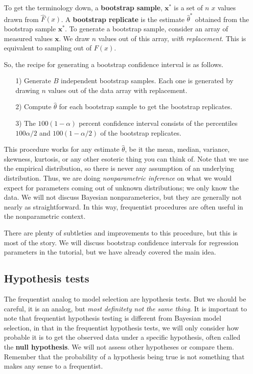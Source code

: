 To get the terminology down, a \textbf{bootstrap sample}, $\mathbf{x}^*$ is a set of $n$ $x$ values drawn from $\hat{F}(x)$. A \textbf{bootstrap replicate} is the estimate $\hat{\theta}^*$ obtained from the bootstrap sample $\mathbf{x}^*$. To generate a bootstrap sample, consider an array of measured values $\mathbf{x}$. We draw $n$ values out of this array, \textit{with replacement}. This is equivalent to sampling out of $F(x)$.

So, the recipe for generating a bootstrap confidence interval is as follows.
\begin{enumerate}
    \item[1)] Generate $B$ independent bootstrap samples. Each one is generated by drawing $n$ values out of the data array with replacement.
    \item[2)] Compute $\hat{\theta}$ for each bootstrap sample to get the bootstrap replicates.
    \item[3)] The $100 (1-\alpha)$ percent confidence interval consists of the percentiles $100\alpha/2$ and $100(1-\alpha/2)$ of the bootstrap replicates.
\end{enumerate}

This procedure works for any estimate $\hat{\theta}$, be it the mean, median, variance, skewness, kurtosis, or any other esoteric thing you can think of. Note that we use the empirical distribution, so there is never any assumption of an underlying distribution. Thus, we are doing \textit{nonparametric inference} on what we would expect for parameters coming out of unknown distributions; we only know the data. We will not discuss Bayesian nonparameterics, but they are generally not nearly as straightforward. In this way, frequentist procedures are often useful in the nonparametric context.

There are plenty of subtleties and improvements to this procedure, but this is most of the story. We will discuss bootstrap confidence intervals for regression parameters in the tutorial, but we have already covered the main idea.


\subsection{Hypothesis tests}
The frequentist analog to model selection are hypothesis tests. But we should be careful, it is an analog, but \textit{most definitety not the same thing}. It is important to note that frequentist hypothesis testing is different from Bayesian model selection, in that in the frequentist hypothesis tests, we will only consider how probable it is to get the observed data under a specific hypothesis, often called the \textbf{null hypothesis}. We will not assess other hypotheses or compare them. Remember that the probability of a hypothesis being true is not something that makes any sense to a frequentist.

